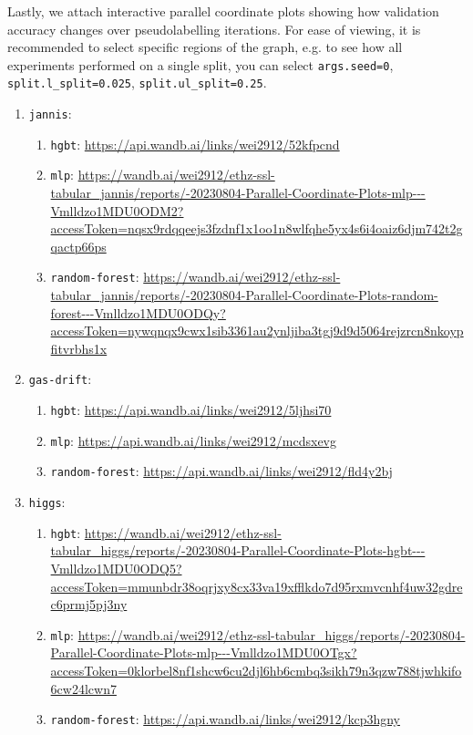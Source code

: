 \documentclass{article}
\begin{document}
Lastly, we attach interactive parallel coordinate plots showing how validation accuracy
changes over pseudolabelling iterations.
For ease of viewing, it is recommended to select specific regions of the graph, e.g. to
see how all experiments performed on a single split, you can select
\texttt{args.seed=0}, \texttt{split.l\_split=0.025}, \texttt{split.ul\_split=0.25}.
{
  \small
  \begin{enumerate}
    \item \texttt{jannis}: \begin{enumerate}
      \item \texttt{hgbt}: \url{https://api.wandb.ai/links/wei2912/52kfpcnd}
      \item \texttt{mlp}: \url{https://wandb.ai/wei2912/ethz-ssl-tabular_jannis/reports/-20230804-Parallel-Coordinate-Plots-mlp---Vmlldzo1MDU0ODM2?accessToken=nqsx9rdqqeejs3fzdnf1x1oo1n8wlfqhe5yx4s6i4oaiz6djm742t2gqactp66ps}
      \item \texttt{random-forest}: \url{https://wandb.ai/wei2912/ethz-ssl-tabular_jannis/reports/-20230804-Parallel-Coordinate-Plots-random-forest---Vmlldzo1MDU0ODQy?accessToken=nywqnqx9cwx1sib3361au2ynljiba3tgj9d9d5064rejzrcn8nkoypfitvrbhs1x}
    \end{enumerate}
    \item \texttt{gas-drift}: \begin{enumerate}
      \item \texttt{hgbt}: \url{https://api.wandb.ai/links/wei2912/5ljhsi70}
      \item \texttt{mlp}: \url{https://api.wandb.ai/links/wei2912/mcdsxevg}
      \item \texttt{random-forest}: \url{https://api.wandb.ai/links/wei2912/fld4y2bj}
    \end{enumerate}
    \item \texttt{higgs}: \begin{enumerate}
      \item \texttt{hgbt}: \url{https://wandb.ai/wei2912/ethz-ssl-tabular_higgs/reports/-20230804-Parallel-Coordinate-Plots-hgbt---Vmlldzo1MDU0ODQ5?accessToken=mmunbdr38oqrjxy8cx33va19xfflkdo7d95rxmvcnhf4uw32gdrec6prmj5pj3ny}
      \item \texttt{mlp}: \url{https://wandb.ai/wei2912/ethz-ssl-tabular_higgs/reports/-20230804-Parallel-Coordinate-Plots-mlp---Vmlldzo1MDU0OTgx?accessToken=0klorbel8nf1shcw6cu2djl6hb6cmbq3sikh79n3qzw788tjwhkifo6cw24lcwn7}
      \item \texttt{random-forest}: \url{https://api.wandb.ai/links/wei2912/kcp3hgny}

\end{enumerate}
\end{enumerate}}
\end{document}
